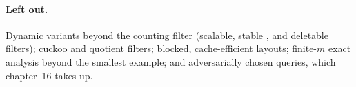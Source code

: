 \paragraph{Left out.}
Dynamic variants beyond the counting filter (scalable, stable
\parencite{deng-rafiei-2006}, and deletable filters); cuckoo
\parencite{fan-cuckoo-2014} and quotient \parencite{bender-quotient-2012}
filters; blocked, cache-efficient layouts; finite-$m$ exact analysis beyond the
smallest example; and adversarially chosen queries, which chapter~16 takes up.
